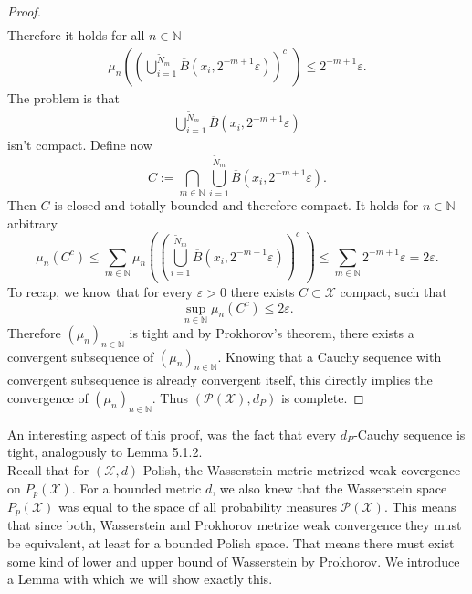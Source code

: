 \documentclass[11pt,a4paper]{article}
\begin{document}
\begin{proof}
\begin{align*}
\end{align*}
Therefore it holds for all $n\in\mathbb{N}$
\begin{align*}
\mu_n\left(\left(\bigcup\limits_{i=1}^{\tilde{N}_m}\overline{B}(x_i,2^{-m+1}\varepsilon)\right)^c\,\,\right) \leq 2^{-m+1}\varepsilon.
\end{align*}
The problem is that 
\begin{align*}
\bigcup\limits_{i=1}^{\tilde{N}_m}\overline{B}(x_i,2^{-m+1}\varepsilon)
\end{align*}
isn't compact. Define now 
\[
C:=\bigcap\limits_{m\in\mathbb{N}}\bigcup\limits_{i=1}^{\tilde{N}_m}\overline{B}(x_i,2^{-m+1}\varepsilon).
\]
Then $C$ is closed and totally bounded and therefore compact. It holds for $n\in\mathbb{N}$ arbitrary
\[
\mu_n(C^c)\leq\sum\limits_{m\in\mathbb{N}} \mu_n\left(\left(\bigcup\limits_{i=1}^{\tilde{N}_m}\overline{B}(x_i,2^{-m+1}\varepsilon)\right)^c\,\,\right) \leq \sum\limits_{m\in\mathbb{N}}2^{-m+1}\varepsilon = 2\varepsilon.
\]
To recap, we know that for every $\varepsilon>0$ there exists $C\subset\mathcal{X}$ compact, such that 
\[
\sup\limits_{n\in\mathbb{N}}\mu_n(C^c)\leq{}2\varepsilon.
\]
Therefore $(\mu_n)_{n\in\mathbb{N}}$ is tight and by Prokhorov's theorem, there exists a convergent subsequence of $(\mu_n)_{n\in\mathbb{N}}$. Knowing that a Cauchy sequence with convergent subsequence is already convergent itself, this directly implies the convergence of $(\mu_n)_{n\in\mathbb{N}}$. Thus $(\mathcal{P(X)},d_P)$ is complete. 
\end{proof}
\noindent{}An interesting aspect of this proof, was the fact that every $d_P$-Cauchy sequence is tight, analogously to Lemma 5.1.2.\vspace{1em}\\
Recall that for $(\mathcal{X},d)$ Polish, the Wasserstein metric metrized weak covergence on $P_p(\mathcal{X})$. For a bounded metric $d$, we also knew that the Wasserstein space $P_p(\mathcal{X})$ was equal to the space of all probability measures $\mathcal{P(X)}$. This means that since both, Wasserstein and Prokhorov metrize weak convergence they must be equivalent, at least for a bounded Polish space. That means there must exist some kind of lower and upper bound of Wasserstein by Prokhorov. We introduce a Lemma with which we will show exactly this. 
\end{document}
